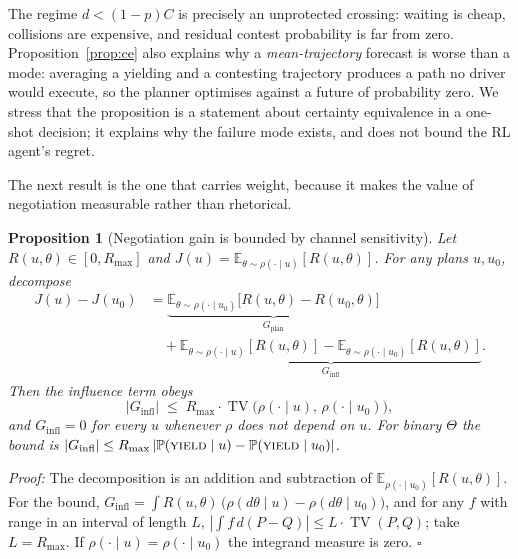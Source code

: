 \documentclass[conference]{IEEEtran}
\DeclareMathOperator{\TV}{TV}
\newcommand{\Expect}{\mathbb{E}}
\newcommand{\Prob}{\mathbb{P}}
\newcommand{\yield}{\textsc{yield}}
\newtheorem{proposition}{Proposition}
\providecommand{\qed}{\hfill$\square$}
\newenvironment{proof}[1][Proof]{\par\noindent\textit{#1:} }{\qed\par}
\begin{document}
The regime $d < (1-p)C$ is precisely an unprotected crossing: waiting is cheap,
collisions are expensive, and residual contest probability is far from zero.
Proposition~\ref{prop:ce} also explains why a \emph{mean-trajectory} forecast is
worse than a mode: averaging a yielding and a contesting trajectory produces a
path no driver would execute, so the planner optimises against a future of
probability zero. We stress that the
proposition is a statement about certainty equivalence in a one-shot decision; it
explains why the failure mode exists, and does not bound the RL agent's regret.

The next result is the one that carries weight, because it makes the value of
negotiation measurable rather than rhetorical.

\begin{proposition}[Negotiation gain is bounded by channel sensitivity]
\label{prop:influence}
Let $R(u,\theta) \in [0, R_{\max}]$ and $J(u) = \Expect_{\theta \sim \rho(\cdot
\mid u)}[R(u,\theta)]$. For any plans $u, u_0$, decompose
\begin{align}
J(u) - J(u_0)
&= \underbrace{\Expect_{\theta \sim \rho(\cdot \mid u_0)}\big[R(u,\theta) - R(u_0,\theta)\big]}_{G_{\mathrm{plan}}} \nonumber \\
&\quad + \underbrace{\Expect_{\theta \sim \rho(\cdot \mid u)}[R(u,\theta)]
- \Expect_{\theta \sim \rho(\cdot \mid u_0)}[R(u,\theta)]}_{G_{\mathrm{infl}}} .
\end{align}
Then the influence term obeys
\begin{equation}
\big|G_{\mathrm{infl}}\big| \;\le\; R_{\max}\cdot \TV\!\big(\rho(\cdot \mid u),\, \rho(\cdot \mid u_0)\big),
\label{eq:tvbound}
\end{equation}
and $G_{\mathrm{infl}} = 0$ for every $u$ whenever $\rho$ does not depend on $u$.
For binary $\Theta$ the bound is
$|G_{\mathrm{infl}}| \le R_{\max}\,|\Prob(\yield \mid u) - \Prob(\yield \mid u_0)|$.
\end{proposition}
\begin{proof}
The decomposition is an addition and subtraction of
$\Expect_{\rho(\cdot \mid u_0)}[R(u,\theta)]$. For the bound, $G_{\mathrm{infl}}
= \int R(u,\theta)\,\big(\rho(d\theta \mid u) - \rho(d\theta \mid u_0)\big)$, and
for any $f$ with range in an interval of length $L$,
$|\int f\,d(P - Q)| \le L\cdot\TV(P,Q)$; take $L = R_{\max}$. If $\rho(\cdot \mid
u) = \rho(\cdot \mid u_0)$ the integrand measure is zero.
\end{proof}
\end{document}
